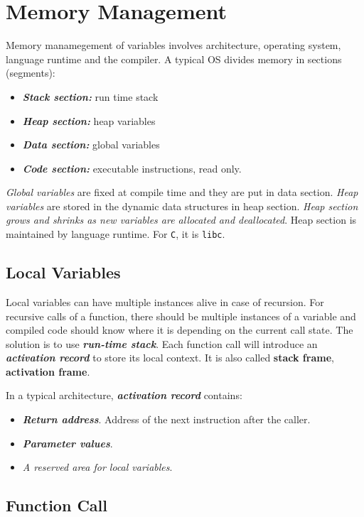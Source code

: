 \section{Memory Management}
\label{sec:memory-management}

Memory manamegement of variables involves architecture, operating system, language runtime and the compiler. A typical OS divides memory in sections (segments):
\begin{itemize}
  \item \textit{\textbf{Stack section:}} run time stack
  \item \textit{\textbf{Heap section:}} heap variables
  \item \textit{\textbf{Data section:}} global variables
  \item \textit{\textbf{Code section:}} executable instructions, read only.
\end{itemize}
\textit{Global variables} are fixed at compile time and they are put in data section. \textit{Heap variables} are stored in the dynamic data structures in heap section. \textit{Heap section grows and shrinks as new variables are allocated and deallocated}. Heap section is maintained by language runtime. For \texttt{C}, it is \texttt{libc}.

\subsection{Local Variables}

Local variables can have multiple instances alive in case of recursion. For recursive calls of a function, there should be multiple instances of a variable and compiled code should know where it is depending on the current call state. The solution is to use \textit{\textbf{run-time stack}}. Each function call will introduce an \textit{\textbf{activation record}} to store its local context. It is also called \textbf{stack frame}, \textbf{activation frame}.

In a typical architecture, \textit{\textbf{activation record}} contains:
\begin{itemize}
  \item \textit{\textbf{Return address}}. Address of the next instruction after the caller.
  \item \textit{\textbf{Parameter values}}.
  \item \textit{A reserved area for local variables}.
\end{itemize}

\subsection{Function Call}

